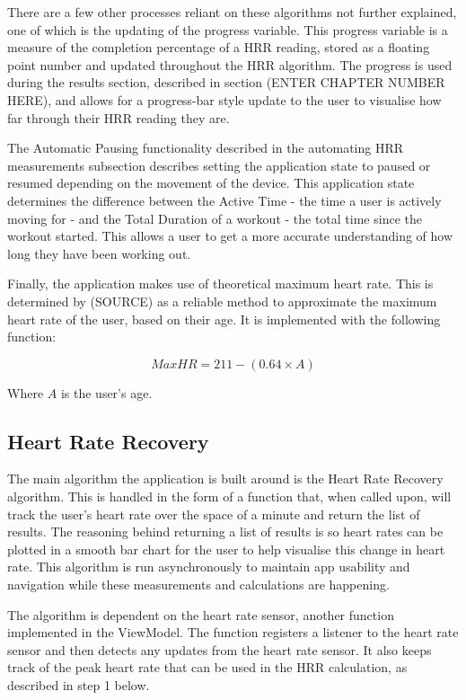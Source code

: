 \documentclass{l4proj}
\begin{document}
There are a few other processes reliant on these algorithms not further explained, one of which is the updating of the progress variable. This progress variable is a measure of the completion percentage of a HRR reading, stored as a floating point number and updated throughout the HRR algorithm. The progress is used during the results section, described in section (ENTER CHAPTER NUMBER HERE), and allows for a progress-bar style update to the user to visualise how far through their HRR reading they are.

The Automatic Pausing functionality described in the automating HRR measurements subsection describes setting the application state to paused or resumed depending on the movement of the device. This application state determines the difference between the Active Time - the time a user is actively moving for - and the Total Duration of a workout - the total time since the workout started. This allows a user to get a more accurate understanding of how long they have been working out.

Finally, the application makes use of theoretical maximum heart rate. This is determined by (SOURCE) as a reliable method to approximate the maximum heart rate of the user, based on their age. It is implemented with the following function:

$$
MaxHR = 211 - (0.64 \times A)
$$

Where $A$ is the user’s age.

\subsection{Heart Rate Recovery}

The main algorithm the application is built around is the Heart Rate Recovery algorithm. This is handled in the form of a function that, when called upon, will track the user’s heart rate over the space of a minute and return the list of results. The reasoning behind returning a list of results is so heart rates can be plotted in a smooth bar chart for the user to help visualise this change in heart rate. This algorithm is run asynchronously to maintain app usability and navigation while these measurements and calculations are happening. 

The algorithm is dependent on the heart rate sensor, another function implemented in the ViewModel. The function registers a listener to the heart rate sensor and then detects any updates from the heart rate sensor. It also keeps track of the peak heart rate that can be used in the HRR calculation, as described in step 1 below. 
\end{document}
